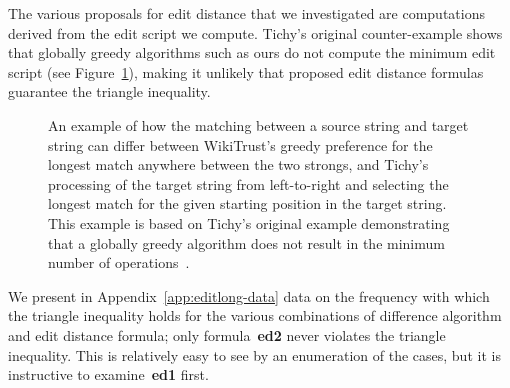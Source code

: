 The various proposals for edit distance that we investigated are
computations derived from the edit script we compute.
Tichy's original counter-example shows that globally greedy algorithms
such as ours do not compute the minimum edit script
(see Figure~\ref{fig:match-comparison}), making it unlikely that
proposed edit distance formulas guarantee the triangle inequality.

\begin{figure}[htbp]
\centering
  \hspace{2ex}
\caption{
  An example of how the matching between a source string and target string
  can differ between WikiTrust's greedy preference for the longest match
  anywhere between the two strongs, and Tichy's processing of the
  target string from left-to-right and selecting the longest match
  for the given starting position in the target string.
  This example is based on Tichy's original example demonstrating that
  a globally greedy algorithm does not result in the minimum number of
  operations~\cite{Tichy1984}.
}
\label{fig:match-comparison}
\end{figure}

We present in Appendix~\ref{app:editlong-data} data on the frequency
with which the triangle inequality holds for the various combinations
of difference algorithm and edit distance formula; only formula~\textbf{ed2}
never violates the triangle inequality.
This is relatively easy to see by an enumeration of the cases, but it
is instructive to examine~\textbf{ed1} first.


